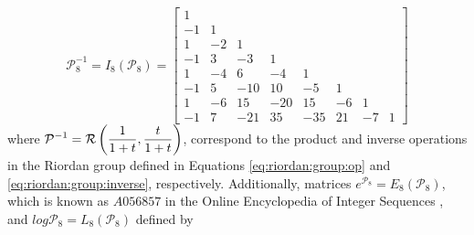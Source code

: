 \begin{example}
\begin{displaymath}
\mathcal{P}_{8}^{-1} = I_{8}\left( \mathcal{P}_{8}\right) = \left[\begin{matrix}1 &   &   &   &   &   &   &  \\-1 & 1 &   &   &   &   &   &  \\1 & -2 & 1 &   &   &   &   &  \\-1 & 3 & -3 & 1 &   &   &   &  \\1 & -4 & 6 & -4 & 1 &   &   &  \\-1 & 5 & -10 & 10 & -5 & 1 &   &  \\1 & -6 & 15 & -20 & 15 & -6 & 1 &  \\-1 & 7 & -21 & 35 & -35 & 21 & -7 & 1\end{matrix}\right]
\end{displaymath}
where $\displaystyle\mathcal{P}^{-1} = \mbox{$\mathcal{R}$}\left(\frac{1}{1+t},\frac{t}{1+t}
\right)$, correspond to the product and inverse operations in the Riordan group
defined in Equations \ref {eq:riordan:group:op} and
\ref{eq:riordan:group:inverse}, respectively. Additionally, matrices
$e^{\mathcal{P}_{8}}= E_{8}\left( \mathcal{P}_{8}\right) $, which is known as
$A056857$ in the Online Encyclopedia of Integer Sequences \citep{OEIS}, and
$log{\mathcal{P}_{8}}= L_{8}\left( \mathcal{P}_{8}\right) $ defined by
\begin{displaymath}

\end{displaymath}
\end{example}
